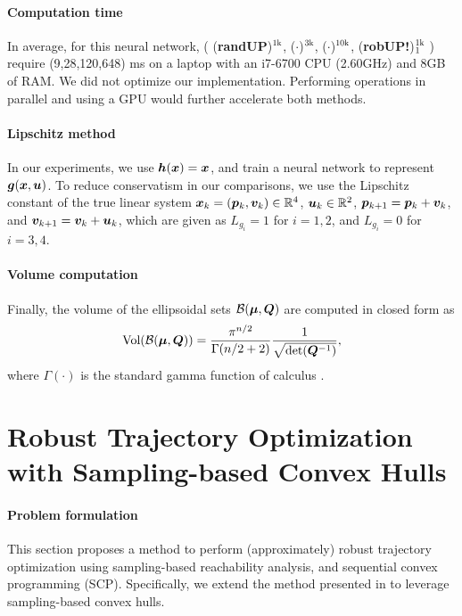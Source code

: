 \documentclass{article}
\begin{document}
\paragraph{Computation time}
In average, for this neural network, (
(\textbf{randUP})${}^{\scalebox{.7}{$1\textrm{k}$}}$, 
(\textbf{$\cdot$})${}^{\scalebox{.7}{$3\textrm{k}$}}$,
(\textbf{$\cdot$})${}^{\scalebox{.7}{$10\textrm{k}$}}$,
(\textbf{robUP!})${}^{\scalebox{.7}{$1\textrm{k}$}}_{\scalebox{.7}{$1$}}$
) require 
(9,28,120,648) ms on a laptop with an i7-6700 CPU (2.60GHz) and 8GB of RAM. 
We did not optimize our implementation. Performing operations in parallel and using a GPU would further accelerate both methods.


\paragraph{Lipschitz method}
In our experiments, we use $\bm{h}(\bm{x})=\bm{x}$, and train a neural network to represent $\bm{g}(\bm{x},\bm{u})$. To reduce conservatism in our comparisons, we use the Lipschitz constant of the true linear system  $\bm{x}_k = (\bm{p}_k,\bm{v}_k) \in \mathbb{R}^4$, $\bm{u}_k \in \mathbb{R}^2$, $\bm{p}_{k+1} = \bm{p}_k + \bm{v}_k$, and $\bm{v}_{k+1} = \bm{v}_k + \bm{u}_k$, which are given as $L_{g_i}=1$ for $i=1,2$, and $L_{g_i}=0$ for $i=3,4$. 


\paragraph{Volume computation}
Finally, the volume of the ellipsoidal sets $\mathcal{B}(\boldsymbol\mu,\bm{Q})$ are computed in closed form as
\vspace{-2mm}
\begin{equation}
\textrm{Vol}(\mathcal{B}(\boldsymbol\mu,\bm{Q})) = 
\frac{\pi^{n/2}}{\Gamma(n/2+2)}\frac{1}{\sqrt{\textrm{det}(\bm{Q}^{-1})}},
\end{equation}
where $\Gamma(\cdot)$ is the standard gamma function of calculus  \citep{Sun2004}.








\section{Robust Trajectory Optimization with Sampling-based Convex Hulls}
\paragraph{Problem formulation} 
This section proposes a method to perform (approximately) robust trajectory optimization using sampling-based reachability analysis, and sequential convex programming (SCP). Specifically, we extend the method presented in \citep{LewBonalli2020} to leverage sampling-based convex hulls. 
\end{document}
